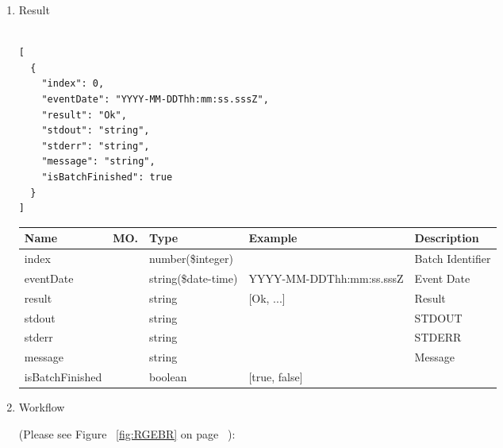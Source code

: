 \begin{enumerate}
\item Result

\begin{tcolorbox}[boxrule=0pt, frame empty]
\begin{verbatim}

[
  {
    "index": 0,
    "eventDate": "YYYY-MM-DDThh:mm:ss.sssZ",
    "result": "Ok",
    "stdout": "string",
    "stderr": "string",
    "message": "string",
    "isBatchFinished": true
  }
]

\end{verbatim}
\end{tcolorbox}

\begin{table}[H]
\footnotesize

\begin{center}
\begin{tabular}{|p{3cm}|l|p{3cm}|p{3cm}|p{4cm}|} 
\hline
\rowcolor{lightgray}	Name	& MO.	& Type	& Example & 	Description \\
\hline

index				&	&	number(\$integer)	&			&	Batch Identifier \\
\hline   

eventDate			&  &	string(\$date-time)	&	YYYY-MM-DDThh:mm:ss.sssZ	&	Event Date \\
\hline

result				&	&	string	&	[Ok, ...]	&	Result \\
\hline

stdout				&	&	string	&			&	STDOUT \\
\hline

stderr				&	&	string	&			&	STDERR \\
\hline

message				&	&	string	&			&	Message \\
\hline

isBatchFinished		&	&	boolean	& [true, false]	&	 \\
\hline

\end{tabular}
\end{center}
\end{table}

\item Workflow

(Please see Figure ~\ref{fig:RGEBR} on page ~\pageref{fig:RGEBR}):


\end{enumerate}
